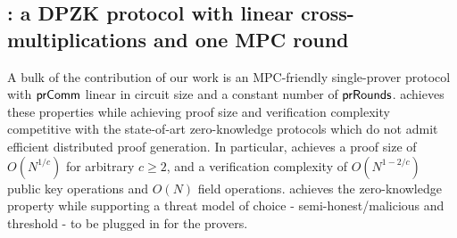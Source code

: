 \subsection{\name{}: a DPZK protocol with linear cross-multiplications and one MPC round}
A bulk of the contribution of our work is an MPC-friendly single-prover protocol \name{} with $\mathsf{prComm}$ linear in circuit size and a constant number of $\mathsf{prRounds}$.  
\name{} achieves these properties while achieving proof size and verification complexity competitive with the state-of-art zero-knowledge protocols which do not admit efficient distributed proof generation. In particular, \name{} achieves a proof size of $O(N^{1/c})$ for arbitrary $c\geq 2$, and a verification complexity of $O(N^{1-2/c})$ public key operations and $O(N)$ field operations. \name{} achieves the zero-knowledge property while supporting a threat model of choice - semi-honest/malicious and threshold - to be plugged in for the provers.






%

